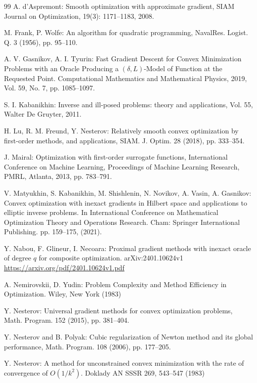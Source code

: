 \documentclass[11pt]{amsart}
\theoremstyle{definition}
\numberwithin{equation}{section}
\begin{document}
\begin{thebibliography}{99}
A. d’Aspremont: Smooth optimization with approximate gradient, SIAM Journal on Optimization, 19(3): 1171–1183, 2008.

M. Frank, P. Wolfe: An algorithm for quadratic programming, NavalRes. Logist. Q. 3 (1956), pp. 95–110.

A. V. Gasnikov, A. I. Tyurin: Fast Gradient Descent for Convex Minimization Problems with an Oracle Producing a $(\delta, L)$-Model of Function at the Requested Point. Computational Mathematics and Mathematical Physics, 2019, Vol. 59, No. 7, pp. 1085--1097.

S. I. Kabanikhin: Inverse and ill-posed problems: theory and applications, Vol. 55, Walter De Gruyter, 2011.

H. Lu, R. M. Freund, Y. Nesterov: Relatively smooth convex optimization by first-order methods, and applications, SIAM. J. Optim. 28 (2018), pp. 333–354.

J. Mairal: Optimization with first-order surrogate functions, International Conference on Machine Learning, Proceedings of Machine Learning Research, PMRL, Atlanta, 2013, pp. 783–791.

V. Matyukhin, S. Kabanikhin, M. Shishlenin, N. Novikov, A. Vasin,  A. Gasnikov: Convex optimization with inexact gradients in Hilbert space and applications to elliptic inverse problems. In International Conference on Mathematical Optimization Theory and Operations Research. Cham: Springer International Publishing. pp. 159--175, (2021).

Y. Nabou, F. Glineur, I. Necoara: Proximal gradient methods with inexact oracle of degree $q$ for composite optimization. arXiv:2401.10624v1 \url{https://arxiv.org/pdf/2401.10624v1.pdf}

A. Nemirovskii, D. Yudin: Problem Complexity and Method Efficiency in Optimization. Wiley, New York (1983)

Y. Nesterov: Universal gradient methods for convex optimization problems, Math. Program. 152 (2015), pp. 381–404.

Y. Nesterov and B. Polyak: Cubic regularization of Newton method and its global performance, Math. Program. 108 (2006), pp. 177–205.

Y. Nesterov: A method for unconstrained convex minimization with the rate of convergence of $O(1/k^2)$. Doklady AN SSSR 269, 543–547 (1983)


\end{thebibliography}
\end{document}

